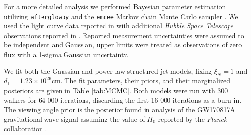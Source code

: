 \documentclass[twocolumn]{aastex62}
\newcommand{\gwbns}{GW170817A}
\newcommand{\afterglowpy}{{\tt afterglowpy}}
\newcommand{\emcee}{{\tt emcee}}
\newcommand{\hubble}{{\em Hubble Space Telescope}}
\newcommand{\planck}{{\em Planck}}
\newcommand{\dL}{\ensuremath{d_{\mathrm{L}}}}
\begin{document}
For a more detailed analysis we performed Bayesian parameter estimation utilizing \afterglowpy{} and the \emcee{} Markov chain Monte Carlo sampler \citep{Foreman-Mackey:2013aa}.  We used the light curve data reported in \citet{Troja:2019ab} with additional \hubble{} observations reported in \citet{Lamb:2019aa}. Reported measurement uncertainties were assumed to be independent and Gaussian, upper limits were treated as observations of zero flux with a 1-sigma Gaussian uncertainty. 

We fit both the Gaussian and power law structured jet models, fixing $\xi_N = 1$ and $\dL = 1.23 \times 10^{26}$cm.  The fit parameters, their priors, and their marginalized posteriors are given in Table \ref{tab:MCMC}. Both models were run with 300 walkers for 64 000 iterations, discarding the first 16 000 iterations as a burn-in.  The viewing angle prior is the posterior found in analysis of the \gwbns{} gravitational wave signal assuming the value of $H_0$ reported by the \planck{} collaboration \citep{Abbott:2017aa, Planck-Collaboration:2016aa, Troja:2018aa}.  
\end{document}
